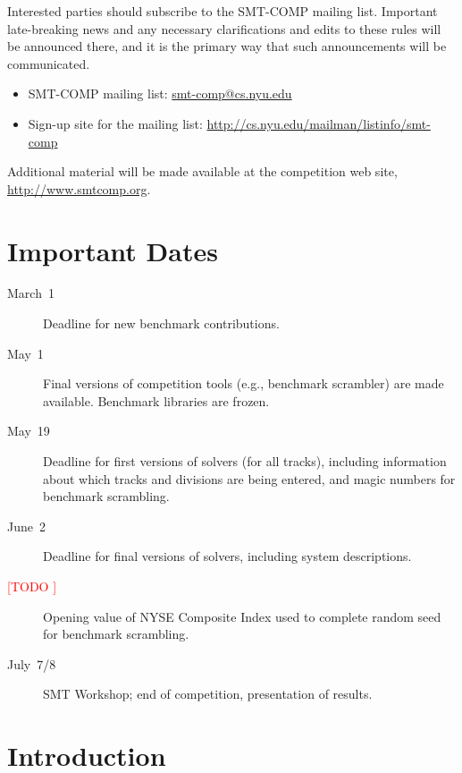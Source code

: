 \documentclass[12pt]{article}
\newcommand{\rem}[1]{\textcolor{red}{[#1]}}
\newcommand{\todo}[1]{\rem{TODO #1}}
\begin{document}
Interested parties should subscribe to the SMT-COMP mailing list.
Important late-breaking news and any necessary clarifications and
edits to these rules will be announced there, and it is the primary
way that such announcements will be communicated.

\begin{itemize}
\item SMT-COMP mailing list:
  \href{mailto:smt-comp@cs.nyu.edu}{\textrm{smt-comp@cs.nyu.edu}}
\item Sign-up site for the mailing list:
  \url{http://cs.nyu.edu/mailman/listinfo/smt-comp}
\end{itemize}

\noindent Additional material will be made available at the
competition web site, \url{http://www.smtcomp.org}.


\newpage

\section{Important Dates}
\label{sec:important}

\begin{description}
\item[March~1] Deadline for new benchmark contributions.
\item[May~1] Final versions of competition tools (e.g., benchmark
  scrambler) are made available.  Benchmark libraries are frozen.
\item[May~19] Deadline for first versions of solvers (for all tracks),
  including information about which tracks and divisions are being
  entered, and magic numbers for benchmark scrambling.
\item[June~2] Deadline for final versions of solvers, including
  system descriptions.
\item[\todo{}] Opening value of NYSE Composite Index used to complete
  random seed for benchmark scrambling.
\item[July~7/8] SMT Workshop; end of competition, presentation of
  results.
\end{description}


\section{Introduction}
\end{document}
